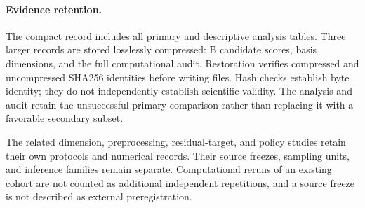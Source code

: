 \paragraph{Evidence retention.}
The compact record includes all primary and descriptive analysis tables. Three larger records are stored losslessly compressed: B candidate scores, basis dimensions, and the full computational audit. Restoration verifies compressed and uncompressed SHA256 identities before writing files. Hash checks establish byte identity; they do not independently establish scientific validity. The analysis and audit retain the unsuccessful primary comparison rather than replacing it with a favorable secondary subset.

The related dimension, preprocessing, residual-target, and policy studies retain their own protocols and numerical records. Their source freezes, sampling units, and inference families remain separate. Computational reruns of an existing cohort are not counted as additional independent repetitions, and a source freeze is not described as external preregistration.

